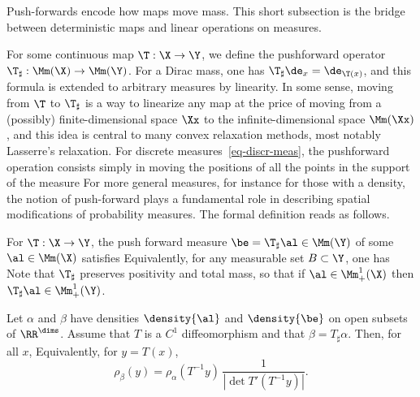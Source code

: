 Push-forwards encode how maps move mass. This short subsection is the bridge between deterministic maps and linear operations on measures.

For some continuous map $\T : \X \rightarrow \Y$, we define the pushforward operator $\T_\sharp : \Mm(\X) \rightarrow \Mm(\Y)$.
%
For a Dirac mass, one has $\T_\sharp \de_{x} = \de_{\T(x)}$, and this formula is extended to arbitrary measures by linearity. In some sense, moving from $\T$ to $\T_\sharp$ is a way to linearize any map at the price of moving from a (possibly) finite-dimensional space $\Xx$ to the infinite-dimensional space $\Mm(\Xx)$, and this idea is central to many convex relaxation methods, most notably Lasserre's relaxation.
%
For discrete measures~\eqref{eq-discr-meas}, the pushforward operation consists simply in moving the positions of all the points in the support of the measure
For more general measures, for instance for those with a density, the notion of push-forward plays a fundamental role in describing spatial modifications of probability measures. The formal definition reads as follows.

\begin{defn}\label{defn-pushfwd}
For $\T : \X \rightarrow \Y$, the push forward measure $\be = \T_\sharp \al \in \Mm(\Y)$ of some $\al \in \Mm(\X)$ satisfies
Equivalently, for any measurable set $B \subset \Y$, one has
Note that $\T_\sharp$ preserves positivity and total mass, so that if $\al \in \Mm_+^1(\X)$ then $\T_\sharp \al \in \Mm_+^1(\Y)$.
\end{defn}


\begin{prop}\label{prop-push-forward-densities}
	Let $\alpha$ and $\beta$ have densities $\density{\al}$ and $\density{\be}$ on open subsets of $\RR^\dims$. Assume that $T$ is a $C^1$ diffeomorphism and that $\beta=T_\sharp\alpha$. Then, for all $x$,
	Equivalently, for $y=T(x)$,
	\[
		\rho_\beta(y)=\rho_\alpha(T^{-1}y)\,
		\frac{1}{|\det T'(T^{-1}y)|}.
	\]
\end{prop}

